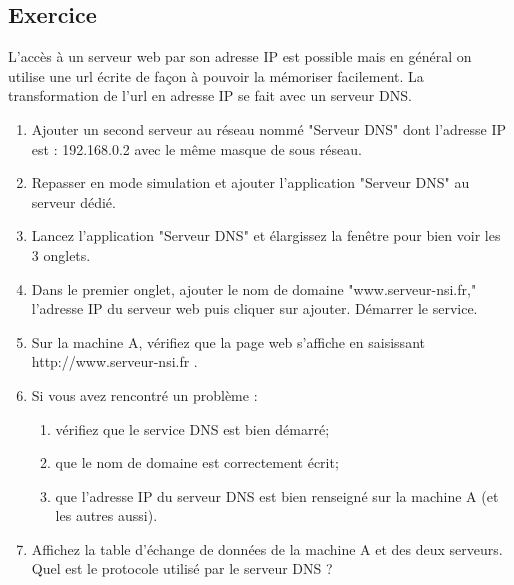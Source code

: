 \documentclass[11pt,a4paper]{article}
\newcounter{numexo}
\begin{document}
\addtocounter{numexo}{1}
\subsection*{\Large Exercice \thenumexo }
L'accès à un serveur web par son adresse IP est possible mais en général on utilise une url écrite de façon à pouvoir la mémoriser facilement. La transformation de l'url en adresse IP se fait avec un serveur DNS.
\begin{enumerate}
\item Ajouter un second serveur au réseau nommé "Serveur DNS" dont l'adresse IP est : 192.168.0.2 avec le même masque de sous réseau.
\item Repasser en mode simulation et ajouter l'application "Serveur DNS" au serveur dédié.
\item Lancez l'application "Serveur DNS" et élargissez la fenêtre pour bien voir les 3 onglets.
\item Dans le premier onglet, ajouter le nom de domaine "www.serveur-nsi.fr," l'adresse IP du serveur web puis cliquer sur ajouter. Démarrer le service.
\item Sur la machine A, vérifiez que la page web s'affiche en saisissant http://www.serveur-nsi.fr .
\item Si vous avez rencontré un problème :
\begin{enumerate}
\item vérifiez que le service DNS est bien démarré;
\item que le nom de domaine est correctement écrit;
\item que l'adresse IP du serveur DNS est bien renseigné sur la machine A (et les autres aussi).
\end{enumerate}
\item Affichez la table d'échange de données de la machine A et des deux serveurs. Quel est le protocole utilisé par le serveur DNS ?
\end{enumerate}

\addtocounter{numexo}{1}
\end{document}
